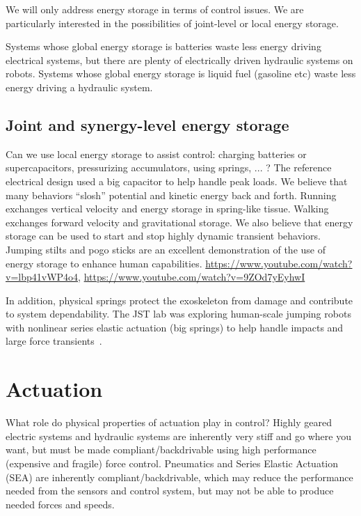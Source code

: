 \documentclass[letterpaper,12pt,fullpage]{article}
\begin{document}
We will only address energy storage
in terms of control issues. We are particularly interested in the
possibilities of joint-level or local energy storage.

Systems whose global energy storage is batteries waste
less energy driving electrical systems, but there are plenty of electrically
driven hydraulic systems on robots.
Systems whose global energy storage is liquid fuel (gasoline etc)
waste less energy driving a hydraulic system.

\subsection{Joint and synergy-level energy storage}

Can we use local energy storage to assist control: charging batteries or
supercapacitors, pressurizing accumulators, using springs, ... ?
The reference electrical design used a big capacitor to help handle
peak loads. We believe that many behaviors ``slosh'' potential and
kinetic energy back and forth.
Running exchanges vertical velocity and energy storage in spring-like
tissue.
Walking exchanges forward velocity and gravitational storage.
We also believe that energy storage can be used to start and stop
highly dynamic transient behaviors.
Jumping stilts and pogo sticks are an excellent demonstration
of the use of energy storage to enhance human
capabilities.
\url{https://www.youtube.com/watch?v=lbp41vWP4o4},
\url{https://www.youtube.com/watch?v=9ZOd7yEyhwI}

In addition, physical springs protect the exoskeleton from damage
and contribute to system dependability.
The JST lab was exploring human-scale jumping robots
with 
nonlinear series elastic actuation (big springs)
to help handle impacts and large force
transients~\cite{IEEE06651562}.

\section{Actuation}

What role do physical properties of actuation play in control? Highly
geared electric systems and hydraulic systems are inherently very
stiff and go where you want, but must be made compliant/backdrivable
using high performance (expensive and fragile) force control.
Pneumatics and Series Elastic Actuation (SEA) are inherently
compliant/backdrivable, which may reduce the performance
needed from the sensors and control system, but may not be able to
produce needed forces and speeds.
\end{document}
